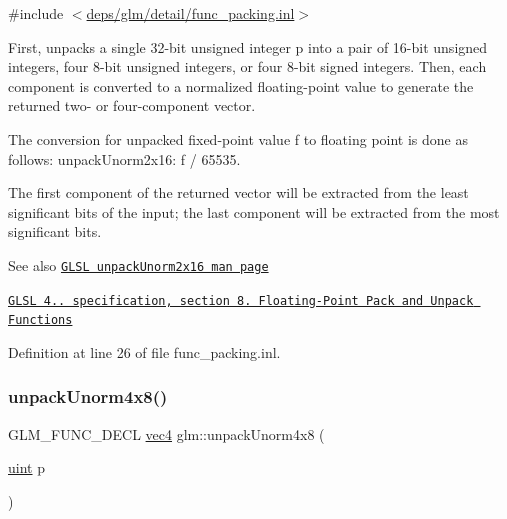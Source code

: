 {\ttfamily \#include $<$\hyperlink{func__packing_8inl}{deps/glm/detail/func\+\_\+packing.\+inl}$>$}

First, unpacks a single 32-\/bit unsigned integer p into a pair of 16-\/bit unsigned integers, four 8-\/bit unsigned integers, or four 8-\/bit signed integers. Then, each component is converted to a normalized floating-\/point value to generate the returned two-\/ or four-\/component vector.

The conversion for unpacked fixed-\/point value f to floating point is done as follows\+: unpack\+Unorm2x16\+: f / 65535.

The first component of the returned vector will be extracted from the least significant bits of the input; the last component will be extracted from the most significant bits.

\begin{DoxySeeAlso}{See also}
\href{http://www.opengl.org/sdk/docs/manglsl/xhtml/unpackUnorm2x16.xml}{\tt G\+L\+SL unpack\+Unorm2x16 man page} 

\href{http://www.opengl.org/registry/doc/GLSLangSpec.4.20.8.pdf}{\tt G\+L\+SL 4.. specification, section 8. Floating-\/\+Point Pack and Unpack Functions} 
\end{DoxySeeAlso}


Definition at line 26 of file func\+\_\+packing.\+inl.

\mbox{\label{group__core__func__packing_ga7f903259150b67e9466f5f8edffcd197}} 
\subsubsection{\texorpdfstring{unpack\+Unorm4x8()}{unpackUnorm4x8()}}
{\footnotesize\ttfamily G\+L\+M\+\_\+\+F\+U\+N\+C\+\_\+\+D\+E\+CL \hyperlink{group__core__types_ga5881b1b022d7fd1b7218f5916532dd02}{vec4} glm\+::unpack\+Unorm4x8 (\begin{DoxyParamCaption}\item[{\hyperlink{group__core__precision_ga4fd29415871152bfb5abd588334147c8}{uint}}]{p }\end{DoxyParamCaption})}



